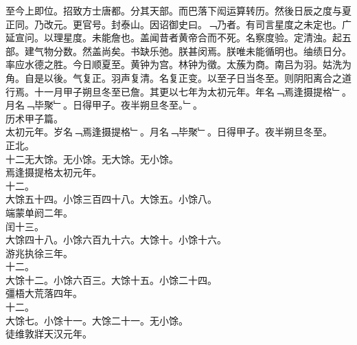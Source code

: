 \documentclass{zhvt-classic}
\begin{document}
\hspace*{2em}至今上即位。招致方士唐都。分其天部。而巴落下闳运算转历。然後日辰之度与夏正同。乃改元。更官号。封泰山。因诏御史曰。﹁乃者。有司言星度之未定也。广延宣问。以理星度。未能詹也。盖闻昔者黄帝合而不死。名察度验。定清浊。起五部。建气物分数。然盖尚矣。书缺乐弛。朕甚闵焉。朕唯未能循明也。䌷绩日分。率应水德之胜。今日顺夏至。黄钟为宫。林钟为徵。太蔟为商。南吕为羽。姑洗为角。自是以後。气复正。羽声复清。名复正变。以至子日当冬至。则阴阳离合之道行焉。十一月甲子朔旦冬至已詹。其更以七年为太初元年。年名﹁焉逢摄提格﹂。月名﹁毕聚﹂。日得甲子。夜半朔旦冬至。﹂。\\
\hspace*{2em}历术甲子篇。\\
\hspace*{2em}太初元年。岁名﹁焉逢摄提格﹂。月名﹁毕聚﹂。日得甲子。夜半朔旦冬至。\\
\hspace*{2em}正北。\\
\hspace*{2em}十二无大馀。无小馀。无大馀。无小馀。\\
\hspace*{2em}焉逢摄提格太初元年。\\
\hspace*{2em}十二。\\
\hspace*{2em}大馀五十四。小馀三百四十八。大馀五。小馀八。\\
\hspace*{2em}端蒙单阏二年。\\
\hspace*{2em}闰十三。\\
\hspace*{2em}大馀四十八。小馀六百九十六。大馀十。小馀十六。\\
\hspace*{2em}游兆执徐三年。\\
\hspace*{2em}十二。\\
\hspace*{2em}大馀十二。小馀六百三。大馀十五。小馀二十四。\\
\hspace*{2em}彊梧大荒落四年。\\
\hspace*{2em}十二。\\
\hspace*{2em}大馀七。小馀十一。大馀二十一。无小馀。\\
\hspace*{2em}徒维敦牂天汉元年。\\
\end{document}
